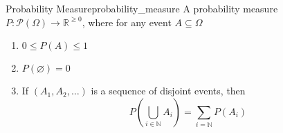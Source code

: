 \begin{definition}{Probability Measure}{probability_measure}
A probability measure \( P : \mathcal{ P }  \left( \Omega  \right)  \to
\mathbb{R} ^{ \ge 0 }    \), where for any event \( A \subseteq \Omega  \) 
\begin{enumerate}
    \item \( 0 \le P\left( A \right) \le 1 \) 
    \item \( P\left( \varnothing  \right) = 0 \) 
    \item If \( \left( A _{ 1 } , A _{ 2 } , \ldots \right)   \) is a sequence
    of disjoint events, then 
    \[
    P\left( \bigcup _{ i \in  \mathbb{N}  } A _{ i }  \right) = \sum_{i =
    \mathbb{N} } P\left( A _{ i }  \right) 
    \]
\end{enumerate}

\end{definition}
